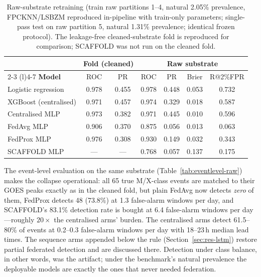 \begin{table}[t]
\centering
\caption{Raw-substrate retraining (train raw partitions 1--4,
natural 2.05\% prevalence, FPCKNN/LSBZM reproduced in-pipeline with
train-only parameters; single-pass test on raw partition 5, natural
1.31\% prevalence; identical frozen protocol). The leakage-free
cleaned-substrate fold is reproduced for comparison; SCAFFOLD was
not run on the cleaned fold.}
\label{tab:rawsubstr}
\small
\begin{tabular}{@{}l c c c c c c@{}}
\toprule
 & \multicolumn{2}{c}{\textbf{Fold (cleaned)}} &
 \multicolumn{4}{c}{\textbf{Raw substrate}} \\
\cmidrule(r){2-3} \cmidrule(l){4-7}
\textbf{Model} & ROC & PR & ROC & PR & Brier & R@2\%FPR \\
\midrule
Logistic regression & 0.978 & 0.455 & 0.978 & 0.448 & 0.053 & 0.732 \\
XGBoost (centralised) & 0.971 & 0.457 & 0.974 & 0.329 & 0.018 & 0.587 \\
Centralised MLP & 0.973 & 0.382 & 0.971 & 0.445 & 0.010 & 0.596 \\
FedAvg MLP & 0.906 & 0.370 & 0.875 & 0.056 & 0.013 & 0.063 \\
FedProx MLP & 0.976 & 0.308 & 0.930 & 0.149 & 0.032 & 0.343 \\
SCAFFOLD MLP & --- & --- & 0.768 & 0.057 & 0.137 & 0.175 \\
\bottomrule
\end{tabular}
\end{table}

The event-level evaluation on the same substrate
(Table~\ref{tab:eventlevel-raw}) makes the collapse operational: all
65 true M/X-class events are matched to their GOES peaks exactly as
in the cleaned fold, but plain FedAvg now detects \emph{zero} of
them, FedProx detects 48 (73.8\%) at 1.3 false-alarm windows per
day, and SCAFFOLD's 83.1\% detection rate is bought at 6.4
false-alarm windows per day---roughly $20\times$ the centralised
arms' burden. The centralised arms detect 61.5--80\% of events at
0.2--0.3 false-alarm windows per day with 18--23\,h median lead
times. The sequence arms appended below the rule
(Section~\ref{sec:res-lstm}) restore partial federated detection
and are discussed there. Detection under class balance, in other
words, was the
artifact; under the benchmark's natural prevalence the deployable
models are exactly the ones that never needed federation.

